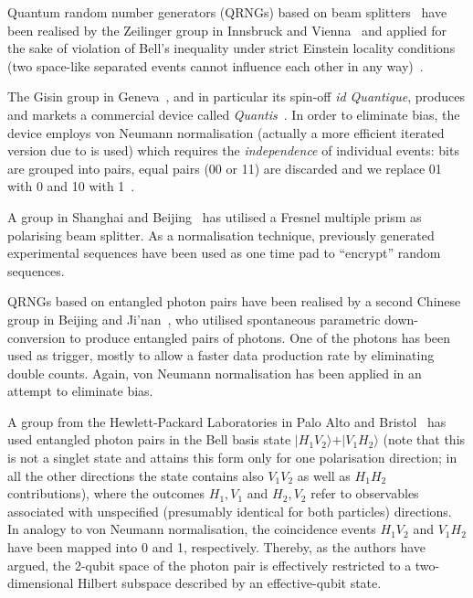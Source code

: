 \documentclass{mscs}
\begin{document}
Quantum random number generators (QRNGs) based on beam splitters~\citep{svozil-qct,rarity-94} have been realised by the Zeilinger group in Innsbruck and Vienna~\citep{zeilinger:qct}
and applied for the sake of violation of {B}ell's inequality under strict {E}instein locality conditions (two space-like separated events cannot influence each other in any way)~\citep{zeilinger-epr-98}.

The Gisin group in Geneva~\citep{stefanov-2000}, and in particular its spin-off {\it id Quantique}, produces and markets a commercial device called {\it Quantis}~\citep{Quantis}.
In order to eliminate bias, the device employs von Neumann normalisation (actually a more efficient iterated version due to \citet{PeresY-1992} is used) which requires the {\em independence} of individual events: bits are grouped into pairs, equal pairs (00 or 11) are discarded and we replace 01 with 0 and 10 with 1~\citep{von-neumann1}.

A group in Shanghai and Beijing~\citep{wang:056107} has utilised a Fresnel multiple prism as polarising beam splitter.
As a normalisation technique, previously generated experimental sequences have been used as one time pad to ``encrypt'' random sequences.

QRNGs based on entangled photon pairs have been realised by a second Chinese group in Beijing and Ji'nan~\citep{0256-307X-21-10-027},
who utilised spontaneous parametric down-conversion to produce entangled pairs of photons.
One of the photons has been used as trigger, mostly to allow a faster data production rate by eliminating double counts.
Again, von Neumann normalisation has been applied in an attempt to eliminate bias.

A group from the Hewlett-Packard Laboratories in Palo Alto and Bristol~\citep{fiorentino:032334} has used entangled photon pairs
in the Bell basis state $\vert H_1 V_2\rangle + \vert V_1 H_2\rangle$ (note that this is not a singlet state and attains this
form only for one polarisation direction; in all the other directions the state contains also $V_1V_2$ as well as $H_1H_2$ contributions), where the outcomes $H_1,V_1$ and $H_2,V_2$
refer to observables associated with unspecified (presumably identical for both particles) directions.
In analogy to von Neumann normalisation, the coincidence events $H_1V_2$ and  $V_1H_2$ have been mapped into 0  and 1, respectively.
Thereby, as the authors have argued, the 2-qubit space of the photon pair is effectively restricted
to a two-dimensional Hilbert subspace described by an effective-qubit state.
\end{document}
